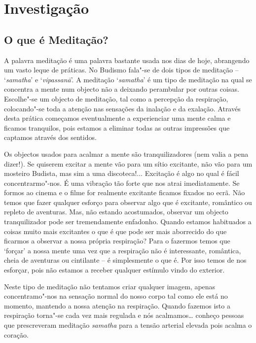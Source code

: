 \part{Investigação}

\chapter{O que é Meditação?}

A palavra meditação é uma palavra bastante usada nos dias de hoje,
abrangendo um vasto leque de práticas. No Budismo fala"-se de dois tipos
de meditação -- `\emph{samatha}' e `\emph{vipassanā}'. A meditação
`\emph{samatha}' é um tipo de meditação na qual se concentra a mente num
objecto não a deixando perambular por outras coisas. Escolhe"-se um
objecto de meditação, tal como a percepção da respiração, colocando"-se
toda a atenção nas sensações da inalação e da exalação. Através desta
prática começamos eventualmente a experienciar uma mente calma e ficamos
tranquilos, pois estamos a eliminar todas as outras impressões que
captamos através dos sentidos.

Os objectos usados para acalmar a mente são tranquilizadores (nem valia
a pena dizer!). Se quiserem excitar a mente vão para um sítio excitante,
não vão para um mosteiro Budista, mas sim a uma discoteca!... Excitação
é algo no qual é fácil concentrarmo"-nos. É uma vibração tão forte que
nos atrai imediatamente. Se formos ao cinema e o filme for realmente
excitante ficamos fixados no ecrã. Não temos que fazer qualquer esforço
para observar algo que é excitante, romântico ou repleto de aventuras.
Mas, não estando acostumados, observar um objecto tranquilizador pode
ser tremendamente enfadonho. Quando estamos habituados a coisas muito
mais excitantes o que é que pode ser mais aborrecido do que ficarmos a
observar a nossa própria respiração? Para o
fazermos temos que `forçar' a nossa mente uma vez que a respiração não é
interessante, romântica, cheia de aventuras ou cintilante -- é
simplesmente o que é. Por isso temos de nos esforçar, pois não estamos a
receber qualquer estímulo vindo do exterior.

Neste tipo de meditação não tentamos criar qualquer imagem, apenas
concentramo"-nos na sensação normal do nosso corpo tal como ele está no
momento, mantendo a nossa atenção na respiração. Quando fazemos isto a
respiração torna"-se cada vez mais regulada e nós acalmamos\ldots{}
conheço pessoas que prescreveram meditação \emph{samatha} para a tensão
arterial elevada pois acalma o coração.

